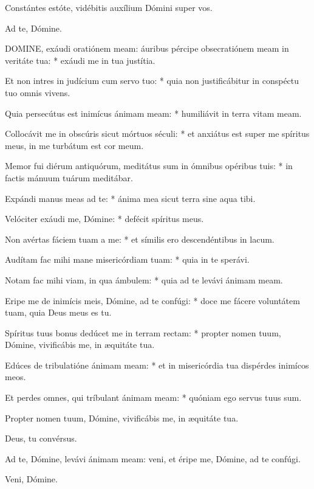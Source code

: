   Constántes estóte, vidébitis auxílium Dómini super vos.

 Ad te, Dómine.


\lettrine[lines=2]{D}{OMINE}, exáudi oratiónem meam: áuribus pércipe obsecratiónem meam in veritáte tua: * exáudi me in tua justítia.

Et non intres in judícium cum servo tuo: * quia non justificábitur in conspéctu tuo omnis vivens.

Quia persecútus est inimícus ánimam meam: * humiliávit in terra vitam meam.

Collocávit me in obscúris sicut mórtuos séculi: * et anxiátus est super me spíritus meus, in me turbátum est cor meum.

Memor fui diérum antiquórum, meditátus sum in ómnibus opéribus tuis: * in factis mánuum tuárum meditábar.

Expándi manus meas ad te: * ánima mea sicut terra sine aqua tibi.

Velóciter exáudi me, Dómine: * defécit spíritus meus.

Non avértas fáciem tuam a me: * et símilis ero descendéntibus in lacum.

Audítam fac mihi mane misericórdiam tuam: * quia in te sperávi.

Notam fac mihi viam, in qua ámbulem: * quia ad te levávi ánimam meam.

Eripe me de inimícis meis, Dómine, ad te confúgi: * doce me fácere voluntátem tuam, quia Deus meus es tu.

Spíritus tuus bonus dedúcet me in terram rectam: * propter nomen tuum, Dómine, vivificábis me, in æquitáte tua.

Edúces de tribulatióne ánimam meam: * et in misericórdia tua dispérdes inimícos meos.

Et perdes omnes, qui tríbulant ánimam meam: * quóniam ego servus tuus sum.

 Propter nomen tuum, Dómine, vivificábis me, in æquitáte tua.

 Deus, tu convérsus.

  Ad te, Dómine, levávi ánimam meam: veni, et éripe me, Dómine, ad te confúgi.

 Veni, Dómine.


